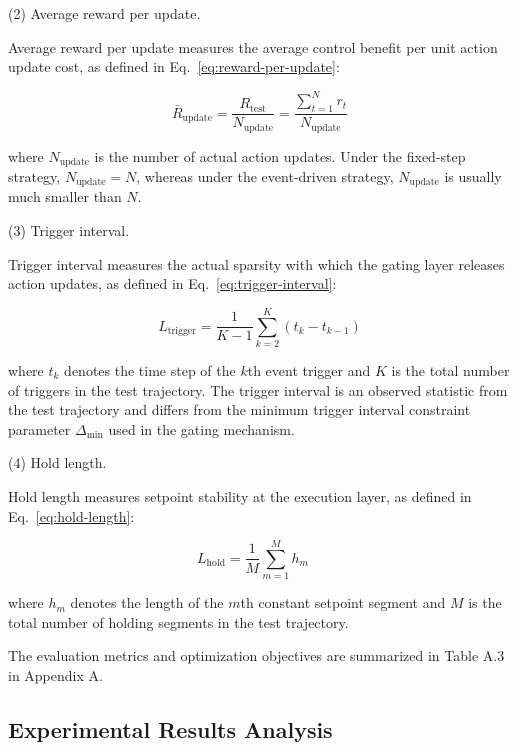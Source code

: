 \documentclass[preprint,12pt,number]{elsarticle}
\begin{document}
\par\smallskip
\noindent (2) Average reward per update.
\par\nobreak Average reward per update measures the average control benefit per unit action update cost, as defined in Eq.~\eqref{eq:reward-per-update}:

\[
\bar{R}_{\text{update}} = \frac{R_{\text{test}}}{N_{\text{update}}} = \frac{\sum_{t=1}^{N} r_t}{N_{\text{update}}} \tag{35}\label{eq:reward-per-update}
\]

\noindent where \(N_{\text{update}}\) is the number of actual action updates. Under the fixed-step strategy, \(N_{\text{update}} = N\), whereas under the event-driven strategy, \(N_{\text{update}}\) is usually much smaller than \(N\).

\par\smallskip
\noindent (3) Trigger interval.
\par\nobreak Trigger interval measures the actual sparsity with which the gating layer releases action updates, as defined in Eq.~\eqref{eq:trigger-interval}:

\[
L_{\text{trigger}} = \frac{1}{K-1}\sum_{k=2}^{K}(t_k - t_{k-1}) \tag{36}\label{eq:trigger-interval}
\]

\noindent where \(t_k\) denotes the time step of the \(k\)th event trigger and \(K\) is the total number of triggers in the test trajectory. The trigger interval is an observed statistic from the test trajectory and differs from the minimum trigger interval constraint parameter \(\Delta_{\min}\) used in the gating mechanism.

\par\smallskip
\noindent (4) Hold length.
\par\nobreak Hold length measures setpoint stability at the execution layer, as defined in Eq.~\eqref{eq:hold-length}:

\[
L_{\text{hold}} = \frac{1}{M}\sum_{m=1}^{M}h_m \quad \tag{37}\label{eq:hold-length}
\]

\noindent where \(h_m\) denotes the length of the \(m\)th constant setpoint segment and \(M\) is the total number of holding segments in the test trajectory.

The evaluation metrics and optimization objectives are summarized in Table A.3 in Appendix A.

\subsection{Experimental Results Analysis}\label{experimental-results-analysis}
\end{document}

